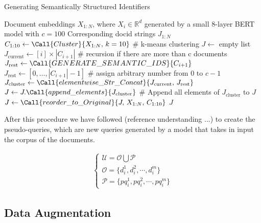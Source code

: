 \begin{algorithm}[H]
    \caption{Generating Semantically Structured Identifiers}
    \label{alg:semanticids}
    \begin{algorithmic}[1]
    \Require Document embeddings $X_{1:N}$, where $X_i \in \mathbb{R}^d$ generated by a small 8-layer BERT model with $c=100$
    \Ensure Corresponding docid strings $J_{1:N}$
        \State $C_{1:10} \gets \Call{Cluster}{X_{1:N},\, k=10}$ \# k-means clustering
        \State $J \gets$ empty list
            \State $J_{\text{current}} \gets [i] \times |C_{i+1}|$
             \# recursion if there are more than c documents
                \State $J_{\text{rest}} \gets \Call{GENERATE\_SEMANTIC\_IDS}{C_{i+1}}$
            \Else
                \State $J_{\text{rest}} \gets [0,\dots,|C_{i+1}| - 1]$ \# assign arbitrary number from 0 to $c-1$
            \EndIf
            \State $J_{\text{cluster}} \gets \Call{elementwise\_Str\_Concat}{J_{\text{current}},\,J_{\text{rest}}}$
            \State $J \gets J.\Call{append\_elements}{J_{\text{cluster}}}$ \# Append all elements of $J_{\text{cluster}}$ to $J$
        \EndFor
        \State $J \gets \Call{reorder\_to\_Original}{J,\,X_{1:N},\,C_{1:10}}$
        \State \Return $J$
    \EndFunction
    \end{algorithmic}
    \end{algorithm}
After this procedure we have followed (reference understanding ...) to create the pseudo-queries, which are new queries generated by a model that takes in input the corpus of the documents.

\begin{align}
    \begin{cases}
        \mathcal{U} = \mathcal{O} \bigcup \mathcal{P} \\
            \mathcal{O} = \{ d_i^1, d_i^2, \cdots, d_i^m \} \\
            \mathcal{P} = \{ pq_i^1, pq_i^2, \cdots, pq_i^m \}
    \end{cases}
\end{align}
\subsection{Data Augmentation}

